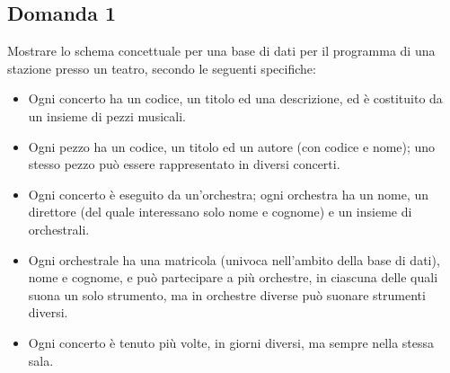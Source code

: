 \documentclass{article}
\numberwithin{equation}{subsection}
\begin{document}
\subsection{Domanda 1}

Mostrare lo schema concettuale per una base di dati per il programma di una stazione presso un teatro, secondo le seguenti specifiche:
\begin{itemize}
    \item Ogni concerto ha un codice, un titolo ed una descrizione, ed è costituito da un insieme di pezzi musicali. 
    \item Ogni pezzo ha un codice, un titolo ed un autore (con codice e nome); uno stesso pezzo può essere rappresentato in diversi concerti. 
    \item Ogni concerto è eseguito da un'orchestra; ogni orchestra ha un nome, un direttore (del quale interessano solo nome e cognome) e un insieme di orchestrali. 
    \item Ogni orchestrale ha una matricola (univoca nell'ambito della base di dati), nome e cognome, e può partecipare a più orchestre, in ciascuna delle quali suona un solo strumento, ma in orchestre diverse può suonare strumenti diversi. 
    \item Ogni concerto è tenuto più volte, in giorni diversi, ma sempre nella stessa sala. 
\end{itemize}
\end{document}
